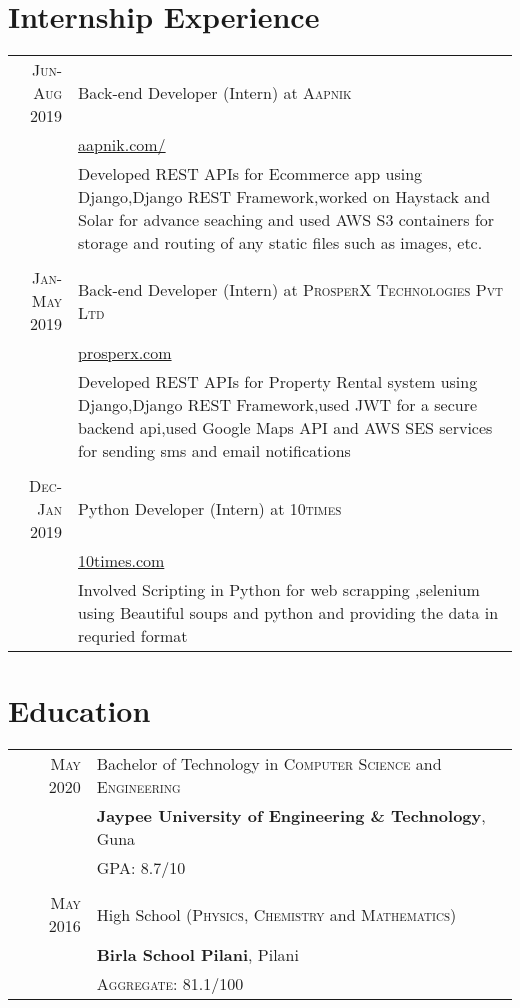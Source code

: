 \documentclass[a4paper,1pt]{article}
\begin{document}
\section{Internship Experience}
\begin{tabular}{r|p{11cm}}

 \textsc{Jun-Aug 2019} & Back-end Developer (Intern) at \textsc{Aapnik}\\&\href{https://www.aapnik.com/}{aapnik.com/}\\&\footnotesize{Developed REST APIs for Ecommerce app using Django,Django REST Framework,worked on Haystack and Solar for advance seaching and used AWS S3 containers for storage and routing of any static files such as images, etc.}\\\multicolumn{2}{c}{} \\

 \textsc{Jan-May 2019} & Back-end Developer (Intern) at \textsc{ProsperX Technologies Pvt Ltd}\\&\href{https://prosperx.com/}{prosperx.com}\\&\footnotesize{Developed REST APIs for Property Rental system using Django,Django REST Framework,used JWT for a secure backend api,used Google Maps API and AWS SES services for sending sms and email notifications}\\\multicolumn{2}{c}{} \\
 
\textsc{Dec-Jan 2019} & Python Developer (Intern) at \textsc{10times}\\&\href{https://www.10times.com}{10times.com}\\&\footnotesize{Involved Scripting in Python for web scrapping ,selenium using Beautiful soups and python and providing the data in requried format}
\end{tabular}

\section{Education}
\begin{tabular}{rl}	
 \textsc{May} 2020 & Bachelor of Technology in \textsc{Computer Science} and \textsc{Engineering}\\& \textbf{Jaypee University of Engineering \& Technology}, Guna\\&
 \normalsize \textsc{GPA}: 8.7/10\\&\\
\textsc{May} 2016& High School (\textsc{Physics}, \textsc{Chemistry} and \textsc{Mathematics})\\&
\normalsize\textbf{Birla School Pilani}, Pilani
\\&\normalsize \textsc{Aggregate}: 81.1/100\\
\end{tabular}
\end{document}
